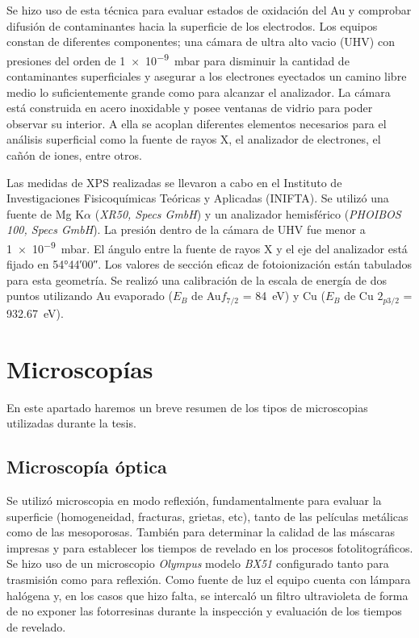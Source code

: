 		Se hizo uso de esta técnica para evaluar estados de oxidación del Au y comprobar difusión de contaminantes hacia la superficie de los electrodos.  Los equipos constan de diferentes componentes; una cámara de ultra alto vacio (UHV) con presiones del orden de \SI{1e-9}{mbar} para disminuir la cantidad de contaminantes superficiales y asegurar a los electrones eyectados un camino libre medio lo suficientemente grande como para alcanzar el analizador. La cámara está construida en acero inoxidable y posee ventanas de vidrio para poder observar su interior. A ella se acoplan diferentes elementos necesarios para el análisis superficial como la fuente de rayos X, el analizador de electrones, el cañón de iones, entre otros.\cite{XPS1978,Corthey2012}

		Las medidas de XPS realizadas se llevaron a cabo en el Instituto de Investigaciones Fisicoquímicas Teóricas y Aplicadas (INIFTA). Se utilizó una fuente de Mg K$\alpha$ (\textit{XR50, Specs GmbH}) y un analizador hemisférico (\textit{PHOIBOS 100, Specs GmbH}). La presión dentro de la cámara de UHV fue menor a \SI{1e-9}{mbar}. El ángulo entre la fuente de rayos X y el eje del analizador está fijado en \ang{54;44;00}. Los valores de sección eficaz de fotoionización están tabulados para esta geometría. Se realizó una calibración de la escala de energía de dos puntos utilizando Au evaporado ($E_B$ de Au$f_{7/2}$ = \SI{84}{\electronvolt}) y Cu ($E_B$ de Cu $2_{p3/2}$ = \SI{932.67}{\electronvolt}).
		
\section{Microscopías}\label{sec:micros}
		
	 En este apartado haremos un breve resumen de los tipos de microscopias utilizadas durante la tesis.

	\subsection{Microscopía óptica}

		Se utilizó microscopia en modo reflexión, fundamentalmente para evaluar la superficie (homogeneidad, fracturas, grietas, etc), tanto de las películas metálicas como de las mesoporosas. También para determinar la calidad de las máscaras impresas y para establecer los tiempos de revelado en los procesos fotolitográficos. Se hizo uso de un microscopio \textit{Olympus} modelo \textit{BX51} configurado tanto para trasmisión como para reflexión. Como fuente de luz el equipo cuenta con lámpara halógena y, en los casos que hizo falta, se intercaló un filtro ultravioleta de forma de no exponer las fotorresinas durante la inspección y evaluación de los tiempos de revelado.
	
